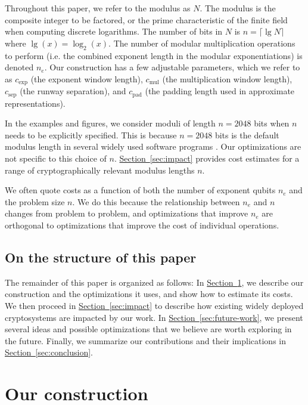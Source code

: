 \documentclass[superscriptaddress,notitlepage,longbibliography]{revtex4-1}
\theoremstyle{definition}
\theoremstyle{definition}
\renewcommand{\sec}[1]{\hyperref[sec:#1]{Section~\ref*{sec:#1}}}
\newcommand{\lenexp}{{n_e}}
\newcommand{\gexp}{{c_{\text{exp}}}}
\newcommand{\gmul}{{c_{\text{mul}}}}
\newcommand{\gsep}{{c_{\text{sep}}}}
\newcommand{\gpad}{{c_{\text{pad}}}}
\begin{document}
Throughout this paper, we refer to the modulus as $N$.
The modulus is the composite integer to be factored, or the prime characteristic of the finite field when computing discrete logarithms.
The number of bits in $N$ is $n = \lceil \lg N \rceil$ where $\lg(x) = \log_2(x)$.
The number of modular multiplication operations to perform (i.e. the combined exponent length in the modular exponentiations) is denoted $\lenexp$.
Our construction has a few adjustable parameters, which we refer to as $\gexp$ (the exponent window length), $\gmul$ (the multiplication window length), $\gsep$ (the runway separation), and $\gpad$ (the padding length used in approximate representations).

In the examples and figures, we consider moduli of length $n = 2048$ bits when $n$ needs to be explicitly specified.
This is because $n = 2048$ bits is the default modulus length in several widely used software programs \cite{ssh-keygen-man-page2018, gpg-faq-key-size2018, open-ssl-source2018}.
Our optimizations are not specific to this choice of $n$.
\sec{impact} provides cost estimates for a range of cryptographically relevant modulus lengths $n$.

We often quote costs as a function of both the number of exponent qubits $\lenexp$ and the problem size $n$.
We do this because the relationship between $\lenexp$ and $n$ changes from problem to problem, and optimizations that improve $\lenexp$ are orthogonal to optimizations that improve the cost of individual operations.



\subsection{On the structure of this paper}

The remainder of this paper is organized as follows:
In \sec{construction}, we describe our construction and the optimizations it uses, and show how to estimate its costs.
We then proceed in
\sec{impact} to describe how existing widely deployed cryptosystems are impacted by our work.
In \sec{future-work}, we present several ideas and possible optimizations that we believe are worth exploring in the future.
Finally, we summarize our contributions and their implications in \sec{conclusion}.








\section{Our construction}
\label{sec:construction}
\end{document}
